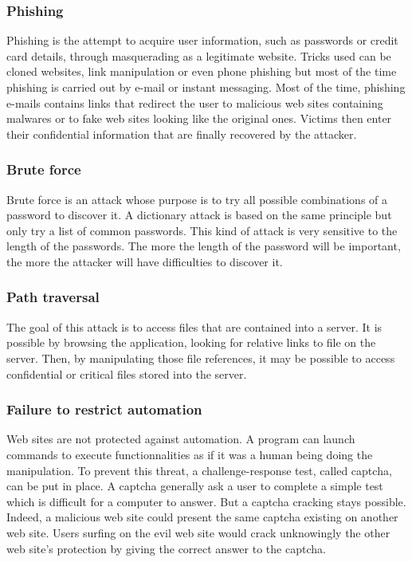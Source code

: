 \subsubsection{Phishing}
Phishing is the attempt to acquire user information, such as passwords or credit
card details, through masquerading as a legitimate website. Tricks used can be
cloned websites, link manipulation or even phone phishing but most of the time
phishing is carried out by e-mail or instant messaging. Most of the time,
phishing e-mails contains links that redirect the user to malicious web sites
containing malwares or to fake web sites looking like the original ones. Victims
then enter their confidential information that are finally recovered by the
attacker.

\subsubsection{Brute force}
Brute force is an attack whose purpose is to try all possible combinations of a
password to discover it. A dictionary attack is based on the same principle but
only try a list of common passwords. This kind of attack is very sensitive to
the length of the passwords. The more the length of the password will be
important, the more the attacker will have difficulties to discover it.

\subsubsection{Path traversal}
The goal of this attack is to access files that are contained into a server. It
is possible by browsing the application, looking for relative links to file on
the server. Then, by manipulating those file references, it may be possible to
access confidential or critical files stored into the server.

\subsubsection{Failure to restrict automation}
Web sites are not protected against automation. A program can launch commands to
execute functionnalities as if it was a human being doing the manipulation. To
prevent this threat, a challenge-response test, called captcha, can be put in
place. A captcha generally ask a user to complete a simple test which is
difficult for a computer to answer. But a captcha cracking stays possible.
Indeed, a malicious web site could present the same captcha existing on another
web site. Users surfing on the evil web site would crack unknowingly the other
web site's protection by giving the correct answer to the captcha.


